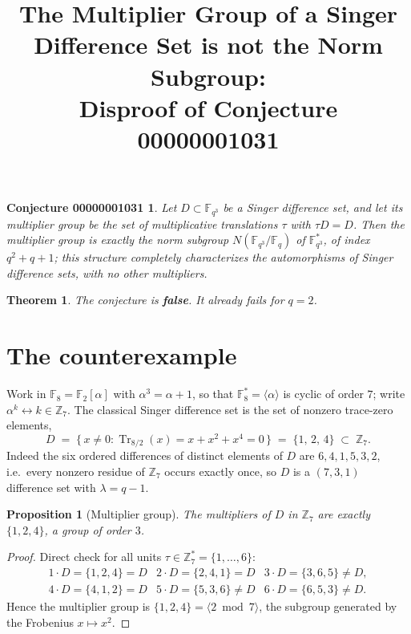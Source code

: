 \documentclass[11pt]{article}
\title{The Multiplier Group of a Singer Difference Set is not the Norm Subgroup:\\
Disproof of Conjecture 00000001031}
\author{}
\date{}
\newtheorem*{claim}{Conjecture 00000001031}
\newtheorem*{prop}{Proposition}
\newtheorem*{thm}{Theorem}
\begin{document}
\maketitle

\begin{claim}
Let $D \subset \mathbb{F}_{q^3}$ be a Singer difference set, and let its
\emph{multiplier group} be the set of multiplicative translations
$\tau$ with $\tau D = D$. Then the multiplier group is exactly the norm
subgroup $N(\mathbb{F}_{q^3}/\mathbb{F}_q)$ of $\mathbb{F}_{q^3}^*$, of index
$q^2+q+1$; this structure completely characterizes the automorphisms of
Singer difference sets, with no other multipliers.
\end{claim}

\begin{thm}
The conjecture is \textbf{false}. It already fails for $q = 2$.
\end{thm}

\section{The counterexample}

Work in $\mathbb{F}_8 = \mathbb{F}_2[\alpha]$ with $\alpha^3 = \alpha + 1$, so
that $\mathbb{F}_8^* = \langle \alpha \rangle$ is cyclic of order $7$; write
$\alpha^k \leftrightarrow k \in \mathbb{Z}_7$. The classical Singer difference
set is the set of nonzero trace-zero elements,
\[
D \;=\; \{\, x \ne 0 : \operatorname{Tr}_{8/2}(x) = x + x^2 + x^4 = 0 \,\}
\;=\; \{1,\,2,\,4\} \;\subset\; \mathbb{Z}_7 .
\]
Indeed the six ordered differences of distinct elements of $D$ are
$6,4,1,5,3,2$, i.e.\ every nonzero residue of $\mathbb{Z}_7$ occurs exactly
once, so $D$ is a $(7,3,1)$ difference set with $\lambda = q-1$.

\begin{prop}[Multiplier group]
The multipliers of $D$ in $\mathbb{Z}_7$ are exactly $\{1,2,4\}$, a group of
order $3$.
\end{prop}
\begin{proof}
Direct check for all units $\tau \in \mathbb{Z}_7^* = \{1,\dots,6\}$:
\[
\begin{array}{lll}
1\cdot D = \{1,2,4\} = D & 2\cdot D = \{2,4,1\} = D & 3\cdot D = \{3,6,5\} \ne D,\\
4\cdot D = \{4,1,2\} = D & 5\cdot D = \{5,3,6\} \ne D & 6\cdot D = \{6,5,3\} \ne D.
\end{array}
\]
Hence the multiplier group is $\{1,2,4\} = \langle 2 \bmod 7\rangle$, the
subgroup generated by the Frobenius $x \mapsto x^2$.
\end{proof}
\end{document}
